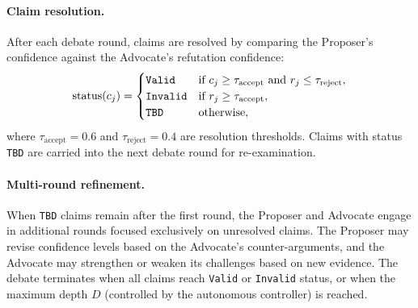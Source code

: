 \paragraph{Claim resolution.}
After each debate round, claims are resolved by comparing the Proposer's confidence against the Advocate's refutation confidence:
\begin{equation}
    \text{status}(c_j) =
    \begin{cases}
        \texttt{Valid} & \text{if } c_j \geq \tau_{\text{accept}} \text{ and } r_j \leq \tau_{\text{reject}}, \\
        \texttt{Invalid} & \text{if } r_j \geq \tau_{\text{accept}}, \\
        \texttt{TBD} & \text{otherwise},
    \end{cases}
    \label{eq:resolution}
\end{equation}
where $\tau_{\text{accept}} = 0.6$ and $\tau_{\text{reject}} = 0.4$ are resolution thresholds.
Claims with status \texttt{TBD} are carried into the next debate round for re-examination.

\paragraph{Multi-round refinement.}
When \texttt{TBD} claims remain after the first round, the Proposer and Advocate engage in additional rounds focused exclusively on unresolved claims.
The Proposer may revise confidence levels based on the Advocate's counter-arguments, and the Advocate may strengthen or weaken its challenges based on new evidence.
The debate terminates when all claims reach \texttt{Valid} or \texttt{Invalid} status, or when the maximum depth $D$ (controlled by the autonomous controller) is reached.

